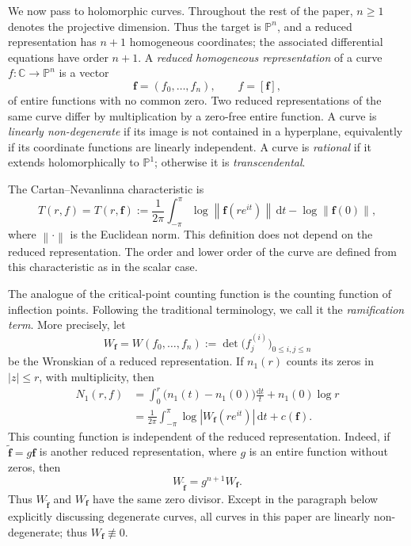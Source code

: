 \documentclass[12pt,letterpaper,reqno]{amsart}
\theoremstyle{definition}
\numberwithin{equation}{section}
\newcommand{\C}{\mathbb C}
\newcommand{\PP}{\mathbb P}
\newcommand{\norm}[1]{\left\lVert#1\right\rVert}
\newcommand{\fv}{\bm f}
\begin{document}
We now pass to holomorphic curves. Throughout the rest of the paper,
$n\geq1$ denotes the projective dimension. Thus the target is
$\PP^{n}$, and a reduced representation has \(n+1\) homogeneous
coordinates; the associated differential equations have order \(n+1\).
A \emph{reduced homogeneous representation} of a curve
$f:\C\to\PP^{n}$ is a vector
\[
 \fv=(f_0,\ldots,f_{n}),\qquad f=[\fv],
\]
of entire functions with no common zero. Two reduced representations of
the same curve differ by multiplication by a zero-free entire function.
A curve is \emph{linearly non-degenerate} if its image is not contained in
a hyperplane, equivalently if its coordinate functions are linearly
independent. A curve is \emph{rational} if it extends holomorphically to
$\PP^1$; otherwise it is \emph{transcendental}.

The Cartan--Nevanlinna characteristic is
\[
 T(r,f)=T(r,\fv):=
 \frac1{2\pi}\int_{-\pi}^{\pi}\log\norm{\fv(re^{it})}\,\mathrm dt
 -\log\norm{\fv(0)},
\]
where $\norm{\cdot}$ is the Euclidean norm. This definition does not
depend on the reduced representation. The order and lower order of the
curve are defined from this characteristic as in the scalar case.

The analogue of the critical-point counting function is the counting
function of inflection points. Following the traditional terminology,
we call it the \emph{ramification term}. More precisely, let
\[
 W_{\fv}=W(f_0,\ldots,f_{n})
 :=\det\bigl(f_j^{(i)}\bigr)_{0\leq i,j\le n}
\]
be the Wronskian of a reduced representation. If $n_1(r)$ counts its zeros
in $|z|\leq r$, with multiplicity, then
\[
 \begin{split}
 N_1(r,f)&=\int_0^r\bigl(n_1(t)-n_1(0)\bigr)\frac{\mathrm dt}{t}
                 +n_1(0)\log r\\
 &=\frac1{2\pi}\int_{-\pi}^{\pi}\log|W_{\fv}(re^{it})|\,\mathrm dt+c(\fv).
 \end{split}
\]
This counting function is independent of the reduced representation.
Indeed, if $\widetilde{\fv}=g\fv$ is another reduced representation,
where $g$ is an entire function without zeros, then
\[
W_{\widetilde{\fv}}=g^{n+1}W_{\fv}.
\]
Thus $W_{\widetilde{\fv}}$ and $W_{\fv}$ have the same zero divisor.
Except in the paragraph below explicitly discussing degenerate curves, all
curves in this paper are linearly non-degenerate; thus
$W_{\fv}\not\equiv0$.
\end{document}
